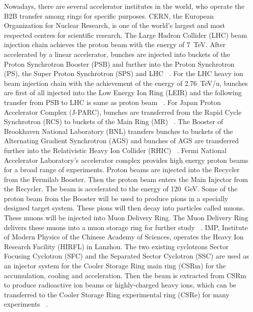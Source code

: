 %

Nowadays, there are several accelerator institutes in the world, who operate the B2B transfer among rings for specific purposes. 
CERN, the European Organization for Nuclear Research, is one of the world's largest and most respected centres for scientific research. The Large Hadron Collider (LHC) beam injection chain achieves the proton beam with the energy of \SI{7}{TeV}. After accelerated by a linear accelerator, bunches are injected into buckets of the Proton Synchrotron Booster (PSB) and further into the Proton Synchrotron (PS), the Super Proton Synchrotron (SPS) and LHC ~\cite{ferrand_synchronization_2015}. For the LHC heavy ion beam injection chain with the achievement of the energy of \SI{2.76}{TeV/u}, bunches are first of all injected into the Low Energy Ion Ring (LEIR) and the following transfer from PSB to LHC is same as proton beam ~\cite{ferrand_synchronization_2015}. For Japan Proton Accelerator Complex (J-PARC), bunches are transferred from the Rapid Cycle Synchrotron (RCS) to buckets of the Main Ring (MR) ~\cite{_j-parc_????}. The Booster of Brookhaven National Laboratory (BNL) transfers bunches to buckets of the Alternating Gradient Synchrotron (AGS) and bunches of AGS are transferred further into the Relativistic Heavy Ion Collider (RHIC) ~\cite{_brookhaven_????}. Fermi National Accelerator Laboratory's accelerator complex provides high energy proton beams for a broad range of experiments. Proton beams are injected into the Recycler from the Fermilab Booster. Then the proton beam enters the Main Injector from the Recycler. The beam is accelerated to the energy of \SI{120}{GeV}. Some of the proton beam from the Booster will be used to produce pions in a specially designed target system. These pions will then decay into particles called muons. These muons will be injected into Muon Delivery Ring. The Muon Delivery Ring delivers these muons into a muon storage ring for further study ~\cite{_fermi_????}. IMP, Institute of Modern Physics of the Chinese Academy of Sciences, operates the Heavy Ion Research Facility (HIRFL) in Lanzhou. The two existing cyclotrons Sector Focusing Cyclotron (SFC) and the Separated Sector Cyclotron (SSC) are used as an injector system for the Cooler Storage Ring main ring (CSRm) for the accumulation, cooling and acceleration. Then the beam is extracted from CSRm to produce radioactive ion beams or highly-charged heavy ions, which can be transferred to the Cooler Storage Ring experimental ring (CSRe) for many experiments ~\cite{_institute_????, man_survey_2002}.  

